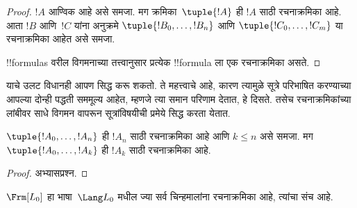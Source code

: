 \documentclass[../../../include/open-logic-section]{subfiles}
\begin{document}
\begin{proof}
$!A$ आण्विक आहे असे समजा. मग क्रमिका~$\tuple{!A}$ ही $!A$ साठी
रचनाक्रमिका आहे.
%
आता $!B$ आणि~$!C$ यांना अनुक्रमे $\tuple{!B_0,\dotsc,!B_n}$ आणि
$\tuple{!C_0,\dotsc,!C_m}$ या रचनाक्रमिका आहेत असे समजा.
%
\begin{enumerate}
\end{enumerate}
!!{formula}s वरील विगमनाच्या तत्त्वानुसार प्रत्येक !!{formula} ला एक
रचनाक्रमिका असते.
\end{proof}

याचे उलट विधानही आपण सिद्ध करू शकतो. ते महत्त्वाचे आहे, कारण त्यामुळे
सूत्रे परिभाषित करण्याच्या आपल्या दोन्ही पद्धती सममूल्य आहेत, म्हणजे
त्या समान परिणाम देतात, हे दिसते. तसेच रचनाक्रमिकांच्या लांबीवर साधे
विगमन वापरून सूत्रांविषयीची प्रमेये सिद्ध करता येतात.

\begin{lem}
$\tuple{!A_0,\dotsc,!A_n}$ ही $!A_n$ साठी रचनाक्रमिका आहे आणि
$k \leq n$ असे समजा. मग $\tuple{!A_0,\dotsc,!A_k}$ ही $!A_k$ साठी
रचनाक्रमिका आहे.
\end{lem}

\begin{proof}
अभ्यासप्रश्न.
\end{proof}

\begin{thm}
$\Frm[L_0]$ हा भाषा~$\Lang L_0$ मधील ज्या सर्व चिन्हमालांना
रचनाक्रमिका आहे, त्यांचा संच आहे.
\end{thm}
\end{document}
